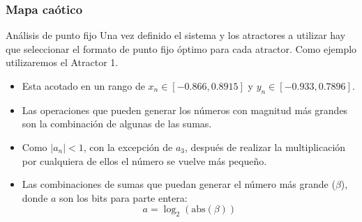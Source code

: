 \documentclass[10pt]{beamer}
\begin{document}
\begin{frame}
    \frametitle{Mapa caótico}
    \begin{block}{Análisis de punto fijo}
        \justifying
        Una vez definido el sistema y los atractores a utilizar hay que seleccionar el formato de punto fijo óptimo para cada atractor. Como ejemplo utilizaremos el Atractor 1. 
        \begin{itemize}
            \item Esta acotado en un rango de $x_{n} \in [-0.866, 0.8915]$ y $y_{n} \in [-0.933, 0.7896]$.
            \item Las operaciones que pueden generar los números con magnitud más grandes son la combinación de algunas de las sumas.
            \item Como $|a_{n}| < 1$, con la excepción de $a_{3}$, después de realizar la multiplicación por cualquiera de ellos el número se vuelve más pequeño.
            \item Las combinaciones de sumas que puedan generar el número más grande ($\beta$), donde $a$ son los bits para parte entera:
            \begin{equation}
                a = \log_{2} ( \text{abs}( \beta ) )
                \label{eq:bits_enteros}
            \end{equation}
        \end{itemize}
    
	\end{block}
\end{frame}
\end{document}
